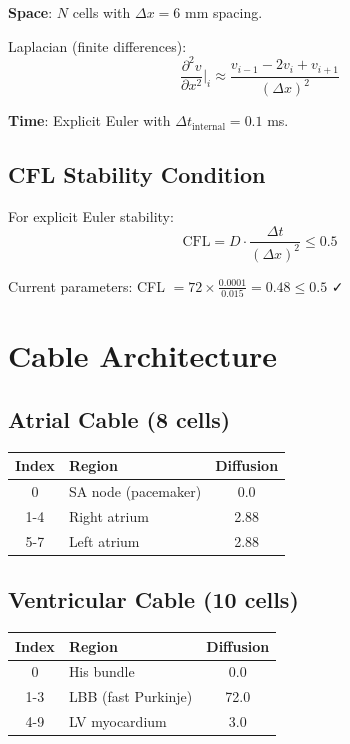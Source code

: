\documentclass[12pt,oneside,a4paper]{book}
\begin{document}
\textbf{Space}: $N$ cells with $\Delta x = 6$ mm spacing.

Laplacian (finite differences):
$$\frac{\partial^2 v}{\partial x^2}\bigg|_i \approx \frac{v_{i-1} - 2v_i + v_{i+1}}{(\Delta x)^2}$$

\textbf{Time}: Explicit Euler with $\Delta t_{\text{internal}} = 0.1$ ms.

\subsection{CFL Stability Condition}

For explicit Euler stability:
$$\text{CFL} = D \cdot \frac{\Delta t}{(\Delta x)^2} \leq 0.5$$

Current parameters: CFL $= 72 \times \frac{0.0001}{0.015} = 0.48 \leq 0.5$ ✓

\section{Cable Architecture}

\subsection{Atrial Cable (8 cells)}
\begin{table}[htb]
\centering
\begin{tabularx}{\textwidth}{|c|X|c|}
\hline
Index & Region & Diffusion \\
\hline
0 & SA node (pacemaker) & 0.0 \\
1-4 & Right atrium & 2.88 \\
5-7 & Left atrium & 2.88 \\
\hline
\end{tabularx}
\label{tab:atrial_cable}
\end{table}

\subsection{Ventricular Cable (10 cells)}
\begin{table}[htb]
\centering
\begin{tabularx}{\textwidth}{|c|X|c|}
\hline
Index & Region & Diffusion \\
\hline
0 & His bundle & 0.0 \\
1-3 & LBB (fast Purkinje) & 72.0 \\
4-9 & LV myocardium & 3.0 \\
\hline
\end{tabularx}
\label{tab:vent_cable}
\end{table}
\end{document}
